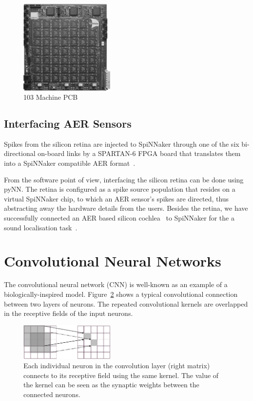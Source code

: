 \documentclass[journal]{journal}
\begin{document}
\begin{figure}
\centering
	\includegraphics[width=0.42\textwidth]{pics/SpiNN5.pdf}
	\caption{103 Machine PCB}
	\label{fig:48node}
\end{figure}

\subsection{Interfacing AER Sensors}
Spikes from the silicon retina are injected to SpiNNaker through one of the six bi-directional on-board links by a SPARTAN-6 FPGA board that translates them into a SpiNNaker compatible AER format~\cite{appnote8}. 

From the software point of view, interfacing the silicon retina can be done using pyNN. 
The retina is configured as a spike source population that resides on a virtual SpiNNaker chip, to which an AER sensor's spikes are directed, thus abstracting away the hardware details from the users\cite{galluppi2012real}.
Besides the retina, we have successfully connected an AER based silicon cochlea~\cite{5537164} to SpiNNaker for the a sound localisation task~\cite{6706931}.

\section{Convolutional Neural Networks}
\label{sec:cnn}
The convolutional neural network (CNN) is well-known as an example of a biologically-inspired model. 
Figure~\ref{fig:conv} shows a typical convolutional connection between two layers of neurons. 
The repeated convolutional kernels are overlapped in the receptive fields of the input neurons. 

\begin{figure}
\centering
	\includegraphics[width=0.42\textwidth]{pics/conv.pdf}
	\caption{Each individual neuron in the convolution layer (right matrix) connects to its receptive field using the same kernel. The value of the kernel can be seen as the synaptic weights between the connected neurons.}
	\label{fig:conv}
\end{figure}
\end{document}
